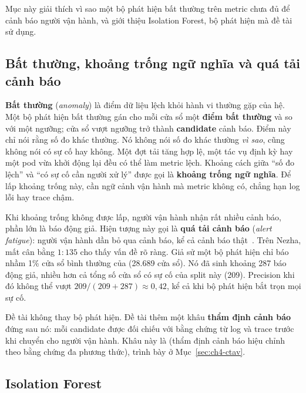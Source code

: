 Mục này giải thích vì sao một bộ phát hiện bất thường trên metric chưa đủ để cảnh báo người vận hành, và giới thiệu Isolation Forest, bộ phát hiện mà đề tài sử dụng.

\subsection{Bất thường, khoảng trống ngữ nghĩa và quá tải cảnh báo}
\label{sec:ch2-khoang-trong}

\textbf{Bất thường} (\emph{anomaly}) là điểm dữ liệu lệch khỏi hành vi thường gặp của hệ. Một bộ phát hiện bất thường gán cho mỗi cửa sổ một \textbf{điểm bất thường} và so với một ngưỡng; cửa sổ vượt ngưỡng trở thành \textbf{candidate} cảnh báo. Điểm này chỉ nói rằng số đo khác thường. Nó không nói số đo khác thường \emph{vì sao}, cũng không nói có sự cố hay không. Một đợt tải tăng hợp lệ, một tác vụ định kỳ hay một pod vừa khởi động lại đều có thể làm metric lệch. Khoảng cách giữa ``số đo lệch'' và ``có sự cố cần người xử lý'' được gọi là \textbf{khoảng trống ngữ nghĩa}. Để lấp khoảng trống này, cần ngữ cảnh vận hành mà metric không có, chẳng hạn log lỗi hay trace chậm.

Khi khoảng trống không được lấp, người vận hành nhận rất nhiều cảnh báo, phần lớn là báo động giả. Hiện tượng này gọi là \textbf{quá tải cảnh báo} (\emph{alert fatigue}): người vận hành dần bỏ qua cảnh báo, kể cả cảnh báo thật~\cite{zhao2020alertstorm}. Trên Nezha, mất cân bằng $1:135$ cho thấy vấn đề rõ ràng. Giả sử một bộ phát hiện chỉ báo nhầm 1\% cửa sổ bình thường của  (28.689 cửa sổ). Nó đã sinh khoảng 287 báo động giả, nhiều hơn cả tổng số cửa sổ có sự cố của split này (209). Precision khi đó không thể vượt $209 / (209 + 287) \approx 0{,}42$, kể cả khi bộ phát hiện bắt trọn mọi sự cố.

Đề tài không thay bộ phát hiện. Đề tài thêm một khâu \textbf{thẩm định cảnh báo} đứng sau nó: mỗi candidate được đối chiếu với bằng chứng từ log và trace trước khi chuyển cho người vận hành. Khâu này là \CTAV{} (thẩm định cảnh báo hiệu chỉnh theo bằng chứng đa phương thức), trình bày ở Mục~\ref{sec:ch4-ctav}.

\subsection{Isolation Forest}
\label{sec:ch2-iforest}

